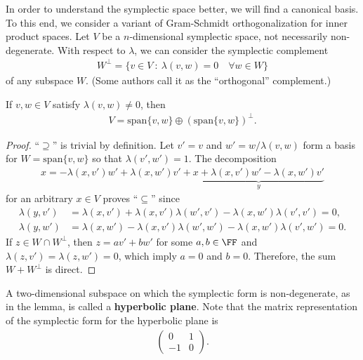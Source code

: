 In order to understand the symplectic space better,
we will find a canonical basis.
To this end, we consider a variant of Gram-Schmidt orthogonalization
for inner product spaces.
Let $V$ be a $n$-dimensional symplectic space, not necessarily non-degenerate.
With respect to $\lambda$, we can consider the symplectic complement 
\begin{align}
W^\perp = \{ v \in V ~:~ \lambda(v,w) = 0 \quad \forall w \in W \}
\end{align}
of any subspace $W$.
(Some authors call it as the ``orthogonal'' complement.)
\begin{lem}
If $v,w \in V$ satisfy $\lambda(v,w) \neq 0$,
then 
\begin{align}
V = \mathrm{span}\{ v, w\} \oplus (\mathrm{span}\{v,w\})^\perp .
\end{align}
\end{lem}
\begin{proof}
``$\supseteq$'' is trivial by definition.
Let $v' = v$ and $w' = w/ \lambda(v,w)$ form a basis for $W =\mathrm{span} \{v,w\}$
so that $\lambda(v',w') = 1$.
The decomposition
\begin{align}
x = -\lambda(x,v')w' + \lambda(x,w')v' + \underbrace{x + \lambda(x,v')w' - \lambda(x,w')v'}_{y}
\end{align}
for an arbitrary $x \in V$ proves ``$\subseteq$'' since
\begin{align}
\lambda(y,v') &= \lambda(x,v') + \lambda(x,v')\lambda(w',v') - \lambda(x,w')\lambda(v',v') = 0,\\
\lambda(y,w') &= \lambda(x,w') - \lambda(x,v')\lambda(w',w') - \lambda(x,w')\lambda(v',w') = 0.
\end{align}
If $z \in W \cap W^\perp$, then $z = a v' + b w'$ for some $a,b \in \FF$ 
and $\lambda(z,v') = \lambda(z,w') = 0$,
which imply $a = 0$ and $b = 0$.
Therefore, the sum $W + W^\perp$ is direct.
\end{proof}
A two-dimensional subspace on which the symplectic form is non-degenerate,
as in the lemma,
is called a {\bf hyperbolic plane}.
Note that the matrix representation of the symplectic form for the hyperbolic plane is
\begin{align}
\begin{pmatrix}
0 & 1 \\ -1 & 0 
\end{pmatrix} .
\end{align}

